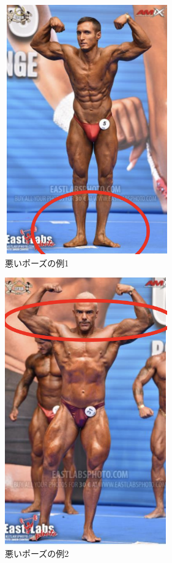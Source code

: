   \begin{figure}[H]
    \begin{center}
        \includegraphics[width=7cm]{figures/badpose1.png}
        \caption{悪いポーズの例1 \cite{JBBF2023}}
        \label{fig:badpose1}
    \end{center}
  \end{figure}
  \begin{figure}[H]
    \begin{center}
        \includegraphics[width=7cm]{figures/badpose2.png}
        \caption{悪いポーズの例2 \cite{JBBF2023}}
        \label{fig:badpose2}
    \end{center}
  \end{figure}
